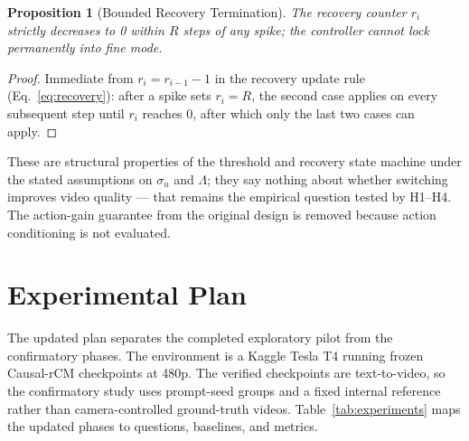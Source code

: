 \documentclass[11pt,a4paper]{article}
\newtheorem{proposition}{Proposition}
\begin{document}
\begin{proposition}[Bounded Recovery Termination]\label{prop:recovery}
The recovery counter $r_i$ strictly decreases to 0 within $R$ steps of any spike; the controller cannot lock permanently into fine mode.
\end{proposition}
\begin{proof}
Immediate from $r_i = r_{i-1} - 1$ in the recovery update rule (Eq.~\eqref{eq:recovery}): after a spike sets $r_i = R$, the second case applies on every subsequent step until $r_i$ reaches 0, after which only the last two cases can apply.
\end{proof}

These are structural properties of the threshold and recovery state machine under the stated assumptions on $\sigma_u$ and $\Lambda$; they say nothing about whether switching improves video quality --- that remains the empirical question tested by H1--H4. The action-gain guarantee from the original design is removed because action conditioning is not evaluated.

\section{Experimental Plan}\label{sec:experiments}

The updated plan separates the completed exploratory pilot from the confirmatory phases. The environment is a Kaggle Tesla T4 running frozen Causal-rCM checkpoints at 480p. The verified checkpoints are text-to-video, so the confirmatory study uses prompt-seed groups and a fixed internal reference rather than camera-controlled ground-truth videos. Table~\ref{tab:experiments} maps the updated phases to questions, baselines, and metrics.
\end{document}

